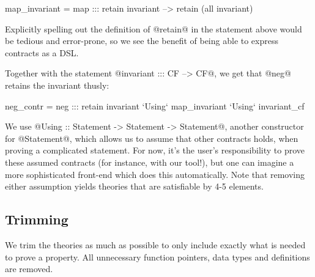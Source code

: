 \begin{code}
map_invariant = map ::: retain invariant
                    --> retain (all invariant)
\end{code}

Explicitly spelling out the definition of @retain@ in the statement
above would be tedious and error-prone, so we see the benefit of being
able to express contracts as a DSL.

Together with the statement @invariant ::: CF --> CF@, we
get that @neg@ retains the invariant thusly:

\begin{code}
neg_contr = neg ::: retain invariant
    `Using` map_invariant
    `Using` invariant_cf
\end{code}

We use @Using :: Statement -> Statement -> Statement@, another
constructor for @Statement@, which allows us to assume that other
contracts holds, when proving a complicated statement. For now, it's
the user's responsibility to prove these assumed contracts (for
instance, with our tool!), but one can imagine a more sophisticated
front-end which does this automatically.  Note that removing either
assumption yields theories that are satisfiable by 4-5 elements.

\subsection{Trimming}

We trim the theories as much as possible to only include exactly what
is needed to prove a property. All unnecessary function pointers, data
types and definitions are removed.

